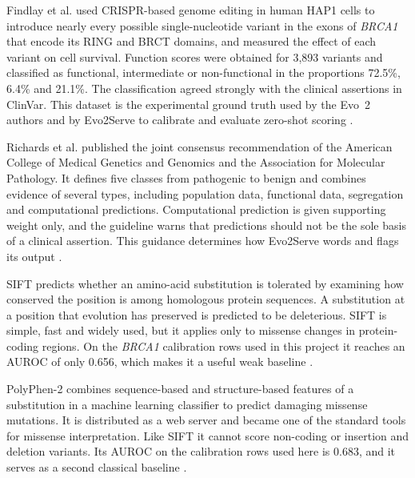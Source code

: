 \newpage
{}
Findlay et al. used CRISPR-based genome editing in human HAP1 cells to introduce nearly every possible single-nucleotide variant in the exons of \textit{BRCA1} that encode its RING and BRCT domains, and measured the effect of each variant on cell survival. Function scores were obtained for 3,893 variants and classified as functional, intermediate or non-functional in the proportions 72.5\%, 6.4\% and 21.1\%. The classification agreed strongly with the clinical assertions in ClinVar. This dataset is the experimental ground truth used by the Evo~2 authors and by Evo2Serve to calibrate and evaluate zero-shot scoring \cite{findlay2018brca1}.

Richards et al. published the joint consensus recommendation of the American College of Medical Genetics and Genomics and the Association for Molecular Pathology. It defines five classes from pathogenic to benign and combines evidence of several types, including population data, functional data, segregation and computational predictions. Computational prediction is given supporting weight only, and the guideline warns that predictions should not be the sole basis of a clinical assertion. This guidance determines how Evo2Serve words and flags its output \cite{richards2015acmg}.

SIFT predicts whether an amino-acid substitution is tolerated by examining how conserved the position is among homologous protein sequences. A substitution at a position that evolution has preserved is predicted to be deleterious. SIFT is simple, fast and widely used, but it applies only to missense changes in protein-coding regions. On the \textit{BRCA1} calibration rows used in this project it reaches an AUROC of only 0.656, which makes it a useful weak baseline \cite{ng2001sift}.

PolyPhen-2 combines sequence-based and structure-based features of a substitution in a machine learning classifier to predict damaging missense mutations. It is distributed as a web server and became one of the standard tools for missense interpretation. Like SIFT it cannot score non-coding or insertion and deletion variants. Its AUROC on the calibration rows used here is 0.683, and it serves as a second classical baseline \cite{adzhubei2010polyphen2}.

